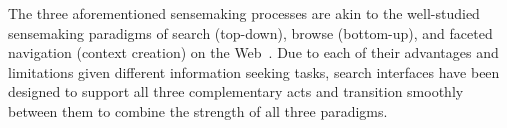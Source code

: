 {  \par The three aforementioned sensemaking processes are akin to the well-studied sensemaking paradigms of search (top-down), browse (bottom-up), and faceted navigation (context creation) on the Web~\cite{Hearst2009,Olston2003}. Due to each of their advantages and limitations given different information seeking tasks, search interfaces have been designed to support all three complementary acts and transition smoothly between them to combine the strength of all three paradigms. 
  }
